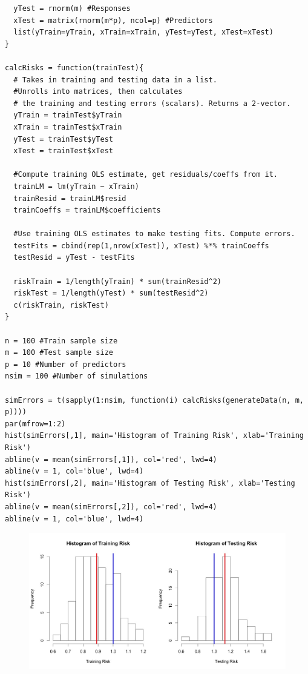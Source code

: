 \documentclass[12pt]{article}
\begin{document}
\begin{enumerate}[(a)]
\begin{lstlisting}
  yTest = rnorm(m) #Responses
  xTest = matrix(rnorm(m*p), ncol=p) #Predictors
  list(yTrain=yTrain, xTrain=xTrain, yTest=yTest, xTest=xTest)
}

calcRisks = function(trainTest){
  # Takes in training and testing data in a list.
  #Unrolls into matrices, then calculates
  # the training and testing errors (scalars). Returns a 2-vector.
  yTrain = trainTest$yTrain
  xTrain = trainTest$xTrain
  yTest = trainTest$yTest
  xTest = trainTest$xTest

  #Compute training OLS estimate, get residuals/coeffs from it.
  trainLM = lm(yTrain ~ xTrain)
  trainResid = trainLM$resid
  trainCoeffs = trainLM$coefficients

  #Use training OLS estimates to make testing fits. Compute errors.
  testFits = cbind(rep(1,nrow(xTest)), xTest) %*% trainCoeffs
  testResid = yTest - testFits
  
  riskTrain = 1/length(yTrain) * sum(trainResid^2)
  riskTest = 1/length(yTest) * sum(testResid^2)
  c(riskTrain, riskTest)
}

n = 100 #Train sample size
m = 100 #Test sample size
p = 10 #Number of predictors
nsim = 100 #Number of simulations

simErrors = t(sapply(1:nsim, function(i) calcRisks(generateData(n, m, p))))
par(mfrow=1:2)
hist(simErrors[,1], main='Histogram of Training Risk', xlab='Training Risk')
abline(v = mean(simErrors[,1]), col='red', lwd=4)
abline(v = 1, col='blue', lwd=4)
hist(simErrors[,2], main='Histogram of Testing Risk', xlab='Testing Risk')
abline(v = mean(simErrors[,2]), col='red', lwd=4)
abline(v = 1, col='blue', lwd=4)
\end{lstlisting}
\begin{figure}[H] \center
\includegraphics[scale=.4]{RiskHist.jpeg}
\end{figure}
\end{enumerate}
\end{document}
